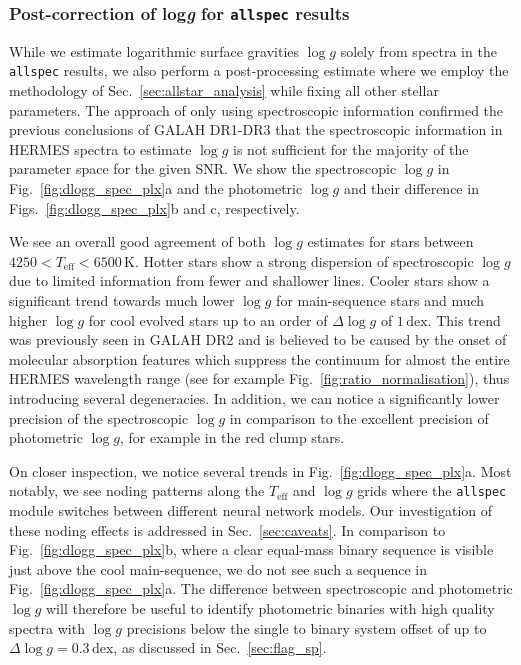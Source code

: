 \documentclass[
  journal=pasa,
  manuscript=research-paper, %
  year=2024,
  volume=37
]{cup-journal}
\newcommand{\Teff}{$T_\mathrm{eff}$\xspace}
\newcommand{\logg}{$\log g$\xspace}
\begin{document}
\subsubsection{Post-correction of {log\textit{g}} for \texttt{allspec} results}

While we estimate logarithmic surface gravities \logg solely from spectra in the \texttt{allspec} results, we also perform a post-processing estimate where we employ the methodology of Sec.~\ref{sec:allstar_analysis} while fixing all other stellar parameters. The approach of only using spectroscopic information confirmed the previous conclusions of GALAH DR1-DR3 that the spectroscopic information in HERMES spectra to estimate \logg is not sufficient for the majority of the parameter space for the given SNR. We show the spectroscopic \logg in Fig.~\ref{fig:dlogg_spec_plx}a and the photometric \logg and their difference in Figs.~\ref{fig:dlogg_spec_plx}b and c, respectively.

We see an overall good agreement of both \logg estimates for stars between $4250 < T_\text{eff} < 6500\,\mathrm{K}$. Hotter stars show a strong dispersion of spectroscopic \logg due to limited information from fewer and shallower lines. Cooler stars show a significant trend towards much lower \logg for main-sequence stars and much higher \logg for cool evolved stars up to an order of $\Delta \log g$ of $1\,\mathrm{dex}$. This trend was previously seen in GALAH DR2 \citep{Buder2018} and is believed to be caused by the onset of molecular absorption features which suppress the continuum for almost the entire HERMES wavelength range (see for example Fig.~\ref{fig:ratio_normalisation}), thus introducing several degeneracies. In addition, we can notice a significantly lower precision of the spectroscopic \logg in comparison to the excellent precision of photometric \logg, for example in the red clump stars.

On closer inspection, we notice several trends in Fig.~\ref{fig:dlogg_spec_plx}a. Most notably, we see noding patterns along the \Teff and \logg grids where the \texttt{allspec} module switches between different neural network models. Our investigation of these noding effects is addressed in Sec.~\ref{sec:caveats}. In comparison to Fig.~\ref{fig:dlogg_spec_plx}b, where a clear equal-mass binary sequence is visible just above the cool main-sequence, we do not see such a sequence in Fig.~\ref{fig:dlogg_spec_plx}a. The difference between spectroscopic and photometric \logg will therefore be useful to identify photometric binaries with high quality spectra with \logg precisions below the single to binary system offset of up to $\Delta \log g = 0.3\,\mathrm{dex}$, as discussed in Sec.~\ref{sec:flag_sp}.
\end{document}
